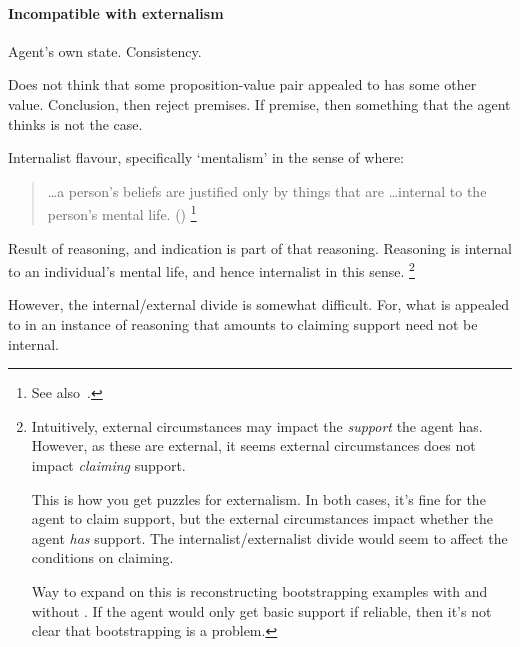 \hozlinedash

\paragraph{Incompatible with externalism}

\begin{note}
  Agent's own state.
  Consistency.

  Does not think that some proposition-value pair appealed to has some other value.
  Conclusion, then reject premises.
  If premise, then something that the agent thinks is not the case.
\end{note}

\begin{note}
  \color{red}
  Internalist flavour, specifically `mentalism' in the sense of \citeauthor{Feldman:2001uy} where:
  \begin{quote}
    \dots a person's beliefs are justified only by things that are \dots internal to the person's mental life.\nolinebreak
    \mbox{}\hfill\mbox{(\citeyear[233]{Feldman:2001uy})}\nolinebreak
    \footnote{
      See also~\textcite[\S4,9]{Pappas:2017vi}.
    }
  \end{quote}
  Result of reasoning, and indication is part of that reasoning.
  Reasoning is internal to an individual's mental life, and hence internalist in this sense.\nolinebreak
  \footnote{
    \color{red}
    Intuitively, external circumstances may impact the \emph{support} the agent has.
    However, as these are external, it seems external circumstances does not impact \emph{claiming} support.

    This is how you get puzzles for externalism.
    In both cases, it's fine for the agent to claim support, but the external circumstances impact whether the agent \emph{has} support.
    The internalist/externalist divide would seem to affect the conditions on claiming.

    Way to expand on this is reconstructing bootstrapping examples with and without \eiS{}.
    If the agent would only get basic support if reliable, then it's not clear that bootstrapping is a problem.
  }

  However, the internal/external divide is somewhat difficult.
  For, what is appealed to in an instance of reasoning that amounts to claiming support need not be internal.
\end{note}

